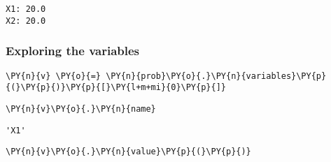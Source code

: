     \begin{Verbatim}[commandchars=\\\{\}]
X1: 20.0
X2: 20.0
    \end{Verbatim}

    \hypertarget{exploring-the-variables}{%
\subsubsection{Exploring the variables}\label{exploring-the-variables}}

    \begin{tcolorbox}[breakable, size=fbox, boxrule=1pt, pad at break*=1mm,colback=cellbackground, colframe=cellborder]
\begin{Verbatim}[commandchars=\\\{\}]
\PY{n}{v} \PY{o}{=} \PY{n}{prob}\PY{o}{.}\PY{n}{variables}\PY{p}{(}\PY{p}{)}\PY{p}{[}\PY{l+m+mi}{0}\PY{p}{]}
\end{Verbatim}
\end{tcolorbox}

    \begin{tcolorbox}[breakable, size=fbox, boxrule=1pt, pad at break*=1mm,colback=cellbackground, colframe=cellborder]
\begin{Verbatim}[commandchars=\\\{\}]
\PY{n}{v}\PY{o}{.}\PY{n}{name}
\end{Verbatim}
\end{tcolorbox}

            \begin{tcolorbox}[breakable, size=fbox, boxrule=.5pt, pad at break*=1mm, opacityfill=0]
\begin{Verbatim}[commandchars=\\\{\}]
'X1'
\end{Verbatim}
\end{tcolorbox}
        
    \begin{tcolorbox}[breakable, size=fbox, boxrule=1pt, pad at break*=1mm,colback=cellbackground, colframe=cellborder]
\begin{Verbatim}[commandchars=\\\{\}]
\PY{n}{v}\PY{o}{.}\PY{n}{value}\PY{p}{(}\PY{p}{)}
\end{Verbatim}
\end{tcolorbox}

